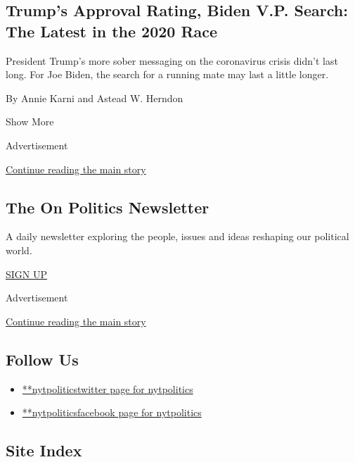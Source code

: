 \begin{enumerate}
  \hypertarget{trumps-approval-rating-biden-vp-search-the-latest-in-the-2020-race}{%
  \subsection{Trump's Approval Rating, Biden V.P. Search: The Latest in
  the 2020
  Race}\label{trumps-approval-rating-biden-vp-search-the-latest-in-the-2020-race}}

  President Trump's more sober messaging on the coronavirus crisis
  didn't last long. For Joe Biden, the search for a running mate may
  last a little longer.

  By Annie Karni and Astead W. Herndon
\end{enumerate}

Show More

Advertisement

\protect\hyperlink{after-mid2}{Continue reading the main story}

\hypertarget{the-on-politics-newsletter}{%
\subsection{The On Politics
Newsletter}\label{the-on-politics-newsletter}}

A daily newsletter exploring the people, issues and ideas reshaping our
political world.

\href{/newsletters/signup/CN}{SIGN UP}

Advertisement

\protect\hyperlink{after-mktg}{Continue reading the main story}

\hypertarget{follow-us}{%
\subsection{Follow Us}\label{follow-us}}

\begin{itemize}
\tightlist
\item
  \href{https://twitter.com/nytpolitics}{**nytpoliticstwitter page for
  nytpolitics}
\item
  \href{https://www.facebook.com/nytpolitics}{**nytpoliticsfacebook page
  for nytpolitics}
\end{itemize}

\hypertarget{site-index}{%
\subsection{Site Index}\label{site-index}}

